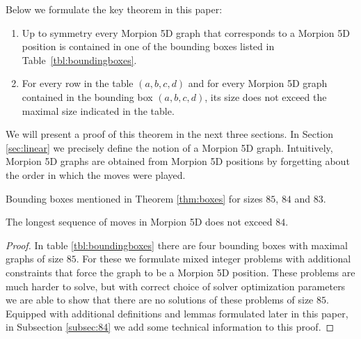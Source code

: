   
Below we formulate the key theorem in this paper: %
\begin{theorem}
\begin{enumerate}
\item Up to symmetry every Morpion 5D graph that corresponds to a Morpion 5D position
    is contained in one of the bounding boxes listed in Table~\ref{tbl:boundingboxes}.
\item For every row in the table $(a,b,c,d)$ and for every Morpion 5D graph contained in the bounding box  $(a,b,c,d)$,
its size does not exceed the maximal size indicated in the table.
\end{enumerate} 
\label{thm:boxes}
\end{theorem}
We will present a proof of this theorem in the next three sections. 
In Section \ref{sec:linear} we precisely define the notion of a Morpion 5D graph. Intuitively, Morpion 5D graphs are obtained from Morpion 5D positions by forgetting about the order in which the moves were played.

\begin{table}[ht]
\centering
 

\caption{Bounding boxes mentioned in Theorem \ref{thm:boxes} for sizes $85$, $84$ and $83$. }
\label{tbl:boundingboxes}
\end{table}




\begin{corollary}
\label{cor:84}
The longest sequence of moves in Morpion 5D does not exceed $84$.
\end{corollary}
\begin{proof} 
In table \ref{tbl:boundingboxes} there are four bounding boxes with maximal graphs of size $85$. 
For these we formulate mixed integer problems with additional constraints that force the graph to
  be a Morpion 5D position.
These problems are much harder to solve, but with correct choice of solver optimization parameters we are able to show
  that there are no solutions of these problems of size $85$. Equipped with additional definitions and lemmas formulated later in this paper, in Subsection \ref{subsec:84} we add some technical 
information to this proof. 
\end{proof}



